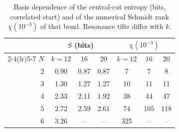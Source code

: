 \begin{table}[ht]
\centering
\footnotesize
\caption{Basis dependence of the central-cut entropy (bits, correlated start) and of the numerical Schmidt rank $\chi(10^{-3})$ of that bond. Resonance tilts differ with $k$. }
\label{tab:k}
\begin{tabular}{rcccccc}
\toprule
 & \multicolumn{3}{c}{$S$ (bits)} & \multicolumn{3}{c}{$\chi(10^{-3})$} \\
\cmidrule(lr){2-4}\cmidrule(lr){5-7}
$N$ & $k=12$ & $16$ & $20$ & $k=12$ & $16$ & $20$ \\
\midrule
2 & 0.90 & 0.87 & 0.87 & 7 & 7 & 8 \\
3 & 1.30 & 1.27 & 1.27 & 10 & 11 & 11 \\
4 & 2.33 & 2.11 & 1.92 & 38 & 44 & 47 \\
5 & 2.72 & 2.59 & 2.61 & 74 & 105 & 118 \\
6 & 3.26 & -- & -- & 325 & -- & -- \\
\bottomrule
\end{tabular}
\end{table}
